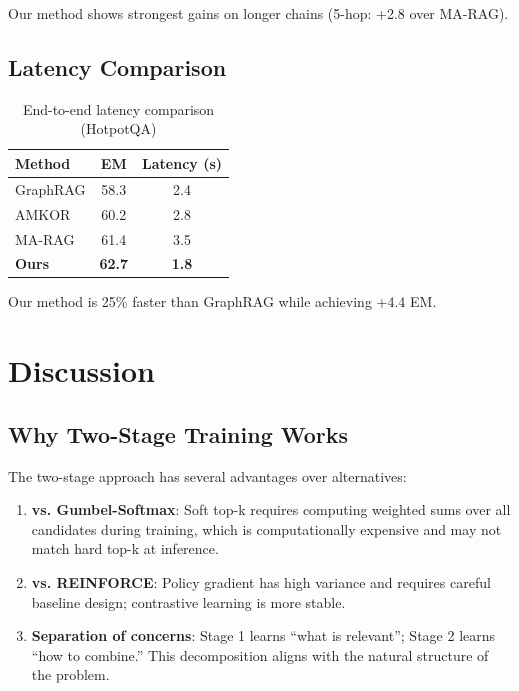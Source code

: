\documentclass[10pt,twocolumn]{article}
\begin{document}
Our method shows strongest gains on longer chains (5-hop: +2.8 over MA-RAG).


\subsection{Latency Comparison}

\begin{table}[h]
\centering
\caption{End-to-end latency comparison (HotpotQA)}
\label{tab:latency}
\small
\begin{tabular}{@{}lcc@{}}
\toprule
\textbf{Method} & \textbf{EM} & \textbf{Latency (s)} \\
\midrule
GraphRAG & 58.3 & 2.4 \\
AMKOR & 60.2 & 2.8 \\
MA-RAG & 61.4 & 3.5 \\
\midrule
\textbf{Ours} & \textbf{62.7} & \textbf{1.8} \\
\bottomrule
\end{tabular}
\end{table}

Our method is 25\% faster than GraphRAG while achieving +4.4 EM.


\section{Discussion}

\subsection{Why Two-Stage Training Works}

The two-stage approach has several advantages over alternatives:

\begin{enumerate}
    \item \textbf{vs. Gumbel-Softmax}: Soft top-k requires computing weighted sums over all candidates during training, which is computationally expensive and may not match hard top-k at inference.
    \item \textbf{vs. REINFORCE}: Policy gradient has high variance and requires careful baseline design; contrastive learning is more stable.
    \item \textbf{Separation of concerns}: Stage 1 learns ``what is relevant''; Stage 2 learns ``how to combine.'' This decomposition aligns with the natural structure of the problem.
\end{enumerate}
\end{document}
